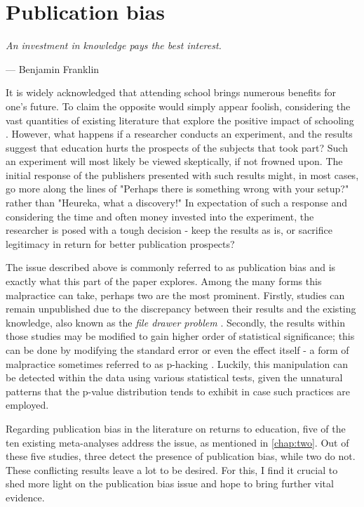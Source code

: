 \chapter{Publication bias}
\label{chap:four}

\begin{quoting}
  \textit{An investment in knowledge pays the best interest.}
\end{quoting}
\vspace{-0.2em}
\hfill --- Benjamin Franklin
\vspace{0.5em}

It is widely acknowledged that attending school brings numerous benefits for one's future. To claim the opposite would simply appear foolish, considering the vast quantities of existing literature that explore the positive impact of schooling \citep{oreopoulos2013making, ritchie2018much, heckman2010rate, psacharopoulos2004returns}. However, what happens if a researcher conducts an experiment, and the results suggest that education hurts the prospects of the subjects that took part? Such an experiment will most likely be viewed skeptically, if not frowned upon. The initial response of the publishers presented with such results might, in most cases, go more along the lines of "Perhaps there is something wrong with your setup?" rather than "Heureka, what a discovery!" In expectation of such a response and considering the time and often money invested into the experiment, the researcher is posed with a tough decision - keep the results as is, or sacrifice legitimacy in return for better publication prospects?

The issue described above is commonly referred to as publication bias and is exactly what this part of the paper explores. Among the many forms this malpractice can take, perhaps two are the most prominent. Firstly, studies can remain unpublished due to the discrepancy between their results and the existing knowledge, also known as the \textit{file drawer problem} \citep{stanley2005beyond}. Secondly, the results within those studies may be modified to gain higher order of statistical significance; this can be done by modifying the standard error or even the effect itself - a form of malpractice sometimes referred to as p-hacking \citep{simmons2011false}. Luckily, this manipulation can be detected within the data using various statistical tests, given the unnatural patterns that the p-value distribution tends to exhibit in case such practices are employed.

Regarding publication bias in the literature on returns to education, five of the ten existing meta-analyses address the issue, as mentioned in \autoref{chap:two}. Out of these five studies, three detect the presence of publication bias, while two do not. These conflicting results leave a lot to be desired. For this, I find it crucial to shed more light on the publication bias issue and hope to bring further vital evidence.

